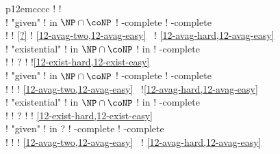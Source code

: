 \begin{landscape}
\begin{tabular}{p{12em}cccc}
  ! %
  ! 
  \\
  ! "given"
  ! in $\NP\cap\coNP$ 
  ! \EXP-complete
  ! \kEXP[2]-complete
  \\[-.5em]
  ! %
  ! {\tiny\cref{?}}                
  !
    {\tiny\cref{12-avag-two,12-avag-easy}~\cite{Fahrenberg&Juhl&Larsen&Srba:2011,Courtois&Schmitz:2014}}
  ! {\tiny\cref{12-avag-hard,12-avag-easy} \cite{Courtois&Schmitz:2014}}\\
  \addlinespace
  ! "existential"
  ! in $\NP\cap\coNP$
  ! in \coNP
  ! \coNP-complete
  \\[-.5em]
  ! %
  ! {\tiny\cite{Chatterjee&Doyen:2012}?}
  !
  !{\tiny\cref{12-exist-hard,12-exist-easy}~\cite{Chatterjee&Doyen&Henzinger&Raskin:2010}}
  \\
  ! "given"
  ! in $\NP\cap\coNP$ 
  ! \EXP-complete
  ! \kEXP[2]-complete
  \\[-.5em]
  ! %
  ! {\tiny\cite{Bouyer&Fahrenberg&Larsen&Markey&Srba:2008}}
  ! {\tiny\cref{12-avag-two,12-avag-easy}~\cite{Fahrenberg&Juhl&Larsen&Srba:2011,Jurdzinski&Lazic&Schmitz:2015}}
  !{\tiny\cref{12-avag-hard,12-avag-easy}~\cite{Courtois&Schmitz:2014,Jurdzinski&Lazic&Schmitz:2015}}
  \\
  \addlinespace
  ! "existential"
  ! in $\NP\cap\coNP$
  ! in \coNP 
  ! \coNP-complete
  \\[-.5em]
  ! %
  ! {\tiny\cite{Chatterjee&Doyen:2012}?}
  ! 
  ! {\tiny\cref{12-exist-hard,12-exist-easy}~\cite{Chatterjee&Doyen&Henzinger&Raskin:2010,Chatterjee&Randour&Raskin:2014}}
  \\
  ! "given"
  ! in \EXP?%
  ! \EXP-complete
  ! \kEXP[2]-complete
  \\[-.5em]
  ! %
  ! {\tiny}
  ! {\tiny\cref{12-avag-two,12-avag-easy}~\cite{Fahrenberg&Juhl&Larsen&Srba:2011,Colcombet&Jurdzinski&Lazic&Schmitz:2017}} 
  ! {\tiny\cref{12-avag-hard,12-avag-easy}~\cite{Courtois&Schmitz:2014,Colcombet&Jurdzinski&Lazic&Schmitz:2017}}\\
  \bottomrule  
  \end{tabular}
  \fi
  \endgroup
    \end{landscape}
